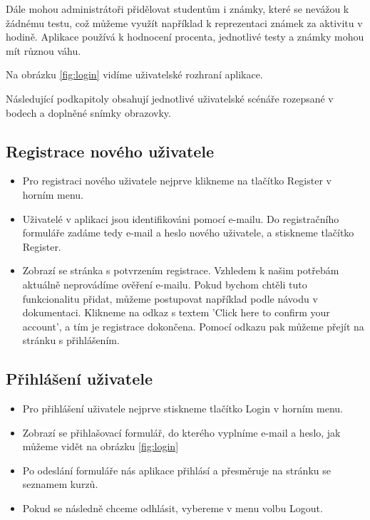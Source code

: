 Dále mohou administrátoři přidělovat studentům i známky, které se nevážou k žádnému testu, což můžeme využít například k reprezentaci známek za aktivitu v hodině.
Aplikace používá k hodnocení procenta, jednotlivé testy a známky mohou mít různou váhu. 

Na obrázku \ref{fig:login} vidíme uživatelské rozhraní aplikace.

\vspace{\baselineskip}

Následující podkapitoly obsahují jednotlivé uživatelské scénáře rozepsané v bodech a doplněné snímky obrazovky.

\subsection{Registrace nového uživatele}

\begin{itemize}
	\item Pro registraci nového uživatele nejprve klikneme na tlačítko Register v horním menu.
	\item Uživatelé v aplikaci jsou identifikováni pomocí e-mailu. Do registračního formuláře zadáme tedy e-mail a heslo nového uživatele, a stiskneme tlačítko Register.
	\item Zobrazí se stránka s potvrzením registrace. Vzhledem k našim potřebám aktuálně neprovádíme ověření e-mailu. Pokud bychom chtěli tuto funkcionalitu přidat, můžeme postupovat například podle návodu v dokumentaci. \cite{AspNetCoreDocs} Klikneme na odkaz s textem 'Click here to confirm your account', a tím je registrace dokončena. Pomocí odkazu pak můžeme přejít na stránku s přihlášením.
\end{itemize}

\subsection{Přihlášení uživatele}

\begin{itemize}
	\item Pro přihlášení uživatele nejprve stiskneme tlačítko Login v horním menu.
	\item Zobrazí se přihlašovací formulář, do kterého vyplníme e-mail a heslo, jak můžeme vidět na obrázku \ref{fig:login}
	\item Po odeslání formuláře nás aplikace přihlásí a přesměruje na stránku se seznamem kurzů.
	\item Pokud se následně chceme odhlásit, vybereme v menu volbu Logout.
\end{itemize}

